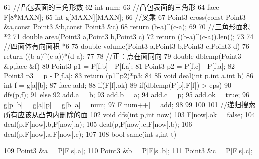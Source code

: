 \documentclass[11pt]{article}
\begin{document}
\begin{Code}
{ 61       //凸包表面的三角形数
 62       int num;
 63       //凸包表面的三角形
 64       face F[8*MAXN];
 65       int g[MAXN][MAXN];
 66       //叉乘
 67       Point3 cross(const Point3 &a,const Point3 &b,const Point3 &c){
 68           return (b-a)^(c-a);
 69       }
 70       //三角形面积 *2
 71       double area(Point3 a,Point3 b,Point3 c){
 72           return ((b-a)^(c-a)).len();
 73       }
 74       //四面体有向面积 *6
 75       double volume(Point3 a,Point3 b,Point3 c,Point3 d){
 76           return ((b-a)^(c-a))*(d-a);
 77       }
 78       //正：点在面同向
 79       double dblcmp(Point3 &p,face &f){
 80           Point3 p1 = P[f.b] - P[f.a];
 81           Point3 p2 = P[f.c] - P[f.a];
 82           Point3 p3 = p - P[f.a];
 83           return (p1^p2)*p3;
 84       }
 85       void deal(int p,int a,int b){
 86           int f = g[a][b];
 87           face add;
 88           if(F[f].ok){
 89                if(dblcmp(P[p],F[f]) > eps)
 90                    dfs(p,f);
 91                else {
 92                    add.a = b;
 93                    add.b = a;
 94                    add.c = p;
 95                    add.ok = true;
 96                    g[p][b] = g[a][p] = g[b][a] = num;
 97                    F[num++] = add;
 98                }
 99           }
100       }
101       //递归搜索所有应该从凸包内删除的面
102       void dfs(int p,int now){
103           F[now].ok = false;
104           deal(p,F[now].b,F[now].a);
105           deal(p,F[now].c,F[now].b);
106           deal(p,F[now].a,F[now].c);
107       }
108       bool same(int s,int t){
109           Point3 &a = P[F[s].a];
110           Point3 &b = P[F[s].b];
111           Point3 &c = P[F[s].c];


}}
\end{Code}
\end{document}
